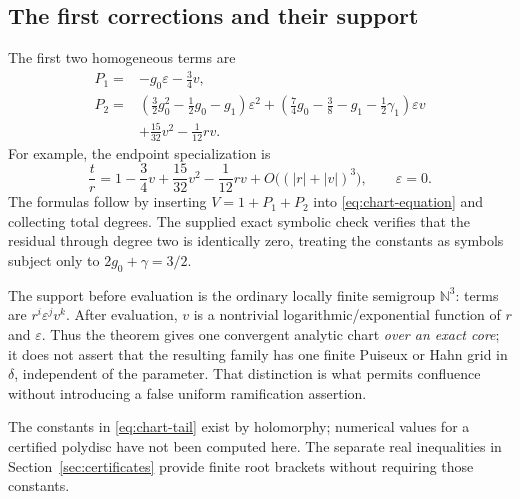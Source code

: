\documentclass[11pt,a4paper]{article}
\numberwithin{equation}{section}
\theoremstyle{definition}
\theoremstyle{remark}
\newcommand{\N}{\mathbb N}
\newcommand{\eps}{\varepsilon}
\begin{document}
\subsection{The first corrections and their support}
The first two homogeneous terms are
\begin{align}
 P_1={}&-g_0\eps-\frac34v, \label{eq:P1}\\
 P_2={}&\left(\frac32g_0^2-\frac12g_0-g_1\right)\eps^2
 +\left(\frac74g_0-\frac38-g_1-\frac12\gamma_1\right)\eps v \nonumber\\
 &+\frac{15}{32}v^2-\frac1{12}rv.
 \label{eq:P2}
\end{align}
For example, the endpoint specialization is
\begin{equation}
 \frac{t}{r}=1-\frac34v+\frac{15}{32}v^2-\frac1{12}rv
       +O\bigl((|r|+|v|)^3\bigr),\qquad \eps=0.
 \label{eq:endpoint-chart}
\end{equation}
The formulas follow by inserting \(V=1+P_1+P_2\) into
\eqref{eq:chart-equation} and collecting total degrees. The supplied exact
symbolic check verifies that the residual through degree two is identically
zero, treating the constants as symbols subject only to
\(2g_0+\gamma=3/2\).

The support before evaluation is the ordinary locally finite semigroup
\(\N^3\): terms are \(r^i\eps^jv^k\). After evaluation, \(v\) is a
nontrivial logarithmic/exponential function of \(r\) and \(\eps\). Thus the
theorem gives one convergent analytic chart \emph{over an exact core}; it does
not assert that the resulting family has one finite Puiseux or Hahn grid in
\(\delta\), independent of the parameter. That distinction is what permits
confluence without introducing a false uniform ramification assertion.

The constants in \eqref{eq:chart-tail} exist by holomorphy; numerical values
for a certified polydisc have not been computed here. The separate real
inequalities in Section~\ref{sec:certificates} provide finite root brackets
without requiring those constants.
\end{document}

